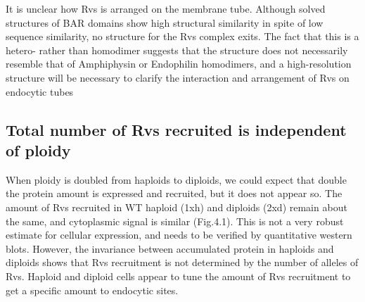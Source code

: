 	\vspace{5mm}
It is unclear how Rvs is arranged on the membrane tube. Although solved structures of BAR domains show high structural similarity in spite of low sequence similarity, no structure for the Rvs complex exits. The fact that this is a hetero- rather than homodimer suggests that the structure does not necessarily resemble that of Amphiphysin or Endophilin homodimers, and a high-resolution structure will be necessary to clarify the interaction and arrangement of Rvs on endocytic tubes

\subsection{Total number of Rvs recruited is independent of ploidy}
When ploidy is doubled from haploids to diploids, we could expect that double the protein amount is expressed and recruited, but it does not appear so. The amount of Rvs recruited in WT haploid (1xh) and diploids (2xd) remain about the same, and cytoplasmic signal is similar (Fig.4.1). This is not a very robust estimate for cellular expression, and needs to be verified by quantitative western blots. However, the invariance between accumulated protein in haploids and diploids shows that Rvs recruitment is not determined by the number of alleles of Rvs. Haploid and diploid cells appear to tune the amount of Rvs recruitment to get a specific amount to endocytic sites.

